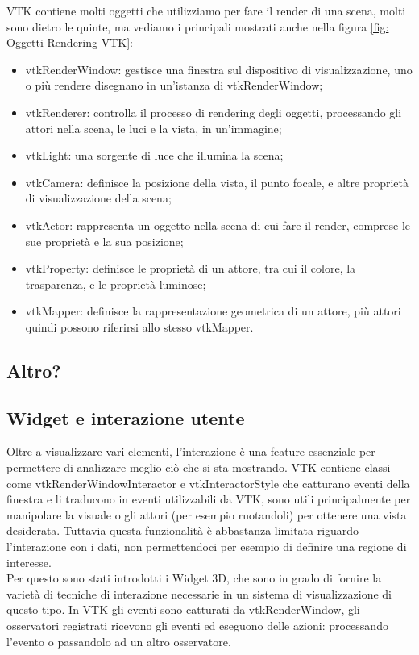 VTK contiene molti oggetti che utilizziamo per fare il render di una scena, molti sono dietro le quinte, ma vediamo i principali mostrati anche nella figura \ref{fig: Oggetti Rendering VTK}:
\begin{itemize}
\item vtkRenderWindow: gestisce una finestra sul dispositivo di visualizzazione, uno o più rendere disegnano in un'istanza di vtkRenderWindow;
\item vtkRenderer: controlla il processo di rendering degli oggetti, processando gli attori nella scena, le luci e la vista, in un'immagine;
\item vtkLight: una sorgente di luce che illumina la scena;
\item vtkCamera: definisce la posizione della vista, il punto focale, e altre proprietà di visualizzazione della scena;
\item vtkActor: rappresenta un oggetto nella scena di cui fare il render, comprese le sue proprietà e la sua posizione;
\item vtkProperty: definisce le proprietà di un attore, tra cui il colore, la trasparenza, e le proprietà luminose;  
\item vtkMapper: definisce la rappresentazione geometrica di un attore, più attori quindi possono riferirsi allo stesso vtkMapper.
\end{itemize}

\subsection{Altro?}\label{sec:aaa}

\subsection{Widget e interazione utente}\label{sec:widget-interazione}
Oltre a visualizzare vari elementi, l'interazione è una feature essenziale per permettere di analizzare meglio ciò che si sta mostrando. VTK contiene classi come vtkRenderWindowInteractor e vtkInteractorStyle che catturano eventi della finestra e li traducono in eventi utilizzabili da VTK, sono utili principalmente per manipolare la visuale o gli attori (per esempio ruotandoli) per ottenere una vista desiderata. Tuttavia questa funzionalità è abbastanza limitata riguardo l'interazione con i dati, non permettendoci per esempio di definire una regione di interesse.\\
Per questo sono stati introdotti i Widget 3D, che sono in grado di fornire la varietà di tecniche di interazione necessarie in un sistema di visualizzazione di questo tipo. In VTK gli eventi sono catturati da vtkRenderWindow, gli osservatori registrati ricevono gli eventi ed eseguono delle azioni: processando l'evento o passandolo ad un altro osservatore.

